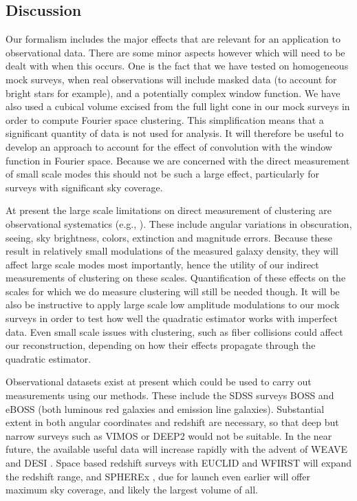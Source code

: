 \documentclass[prd,amsmath,amssymb,floatfix,superscriptaddress,nofootinbib,twocolumn]{revtex4-1}
\begin{document}
\subsection{Discussion}

Our formalism includes the major effects that are relevant for an application to observational data. There are some minor aspects however which will need to be dealt with when this occurs. One is the fact that we have tested on homogeneous mock surveys, when real observations will include masked data (to account for bright stars for example), and a potentially complex window function. We have also used a cubical volume excised from the full light cone in our mock surveys in order to compute Fourier space clustering. This simplification means that a significant quantity of data is not used for analysis. It will therefore be useful to develop an approach to account for the effect of convolution with the window function in Fourier space. Because we are concerned with the direct measurement of small scale modes this should not be such a large effect, particularly for surveys with significant sky coverage.

At present the large scale limitations on direct measurement of clustering are observational systematics (e.g., \cite{Ho:2012sh}). These include angular variations in obscuration, seeing, sky brightness, colors, extinction and magnitude errors. Because these result in relatively small modulations of the measured galaxy density, they will affect large scale modes most importantly, hence the utility of our indirect measurements of clustering on these scales. Quantification of these effects on the scales for which we do measure clustering will still be needed though. It will be also be instructive to apply large scale low amplitude modulations to our mock surveys in order to test how well the quadratic estimator works with imperfect data. Even small scale issues with clustering, such as fiber collisions \cite{Hahn:2016kiy} could affect our reconstruction, depending on how their effects propagate through the quadratic estimator.

Observational datasets exist at present which could be used to carry out measurements using our methods. These include the SDSS surveys BOSS \cite{Dawson:2013boss} and eBOSS \cite{Dawson:2015wdb} (both luminous red galaxies and emission line galaxies). Substantial extent in both angular coordinates and redshift are necessary, so that deep but narrow surveys such as VIMOS \cite{Fevre:2014tna} or DEEP2 \cite{Coil:2005ap} would not be suitable. In the near future, the available useful data will increase rapidly with the advent of WEAVE \cite{Dalton:2014wv} and DESI \cite{DESI:2019ds}. Space based redshift surveys  with EUCLID \cite{Amiaux:2012ec} and WFIRST \cite{Wfirst:2012jg} will expand the redshift range, and SPHEREx \cite{Dore:2014cca}, due for launch even earlier will offer maximum sky coverage, and likely the largest volume of all.
\end{document}
